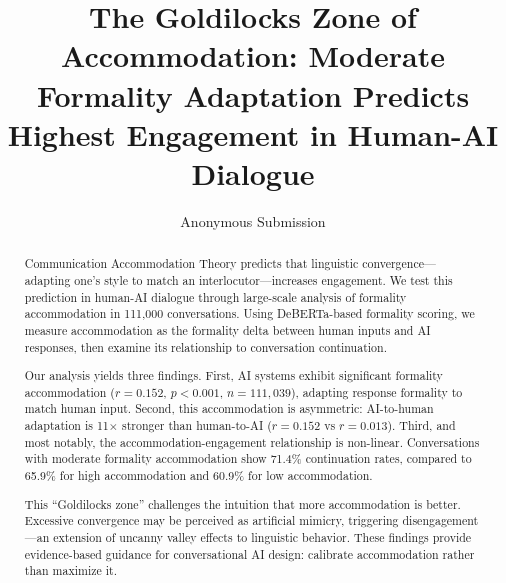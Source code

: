 \documentclass[letterpaper]{article}
\title{The Goldilocks Zone of Accommodation: Moderate Formality Adaptation Predicts Highest Engagement in Human-AI Dialogue}
\author{Anonymous Submission}
\date{}
\begin{document}
\maketitle

\begin{abstract}
Communication Accommodation Theory predicts that linguistic convergence---adapting one's style to match an interlocutor---increases engagement. We test this prediction in human-AI dialogue through large-scale analysis of formality accommodation in 111,000 conversations. Using DeBERTa-based formality scoring, we measure accommodation as the formality delta between human inputs and AI responses, then examine its relationship to conversation continuation.

Our analysis yields three findings. First, AI systems exhibit significant formality accommodation ($r=0.152$, $p<0.001$, $n=111,039$), adapting response formality to match human input. Second, this accommodation is asymmetric: AI-to-human adaptation is 11$\times$ stronger than human-to-AI ($r=0.152$ vs $r=0.013$). Third, and most notably, the accommodation-engagement relationship is non-linear. Conversations with moderate formality accommodation show 71.4\% continuation rates, compared to 65.9\% for high accommodation and 60.9\% for low accommodation.

This ``Goldilocks zone'' challenges the intuition that more accommodation is better. Excessive convergence may be perceived as artificial mimicry, triggering disengagement---an extension of uncanny valley effects to linguistic behavior. These findings provide evidence-based guidance for conversational AI design: calibrate accommodation rather than maximize it.
\end{abstract}











\end{document}
